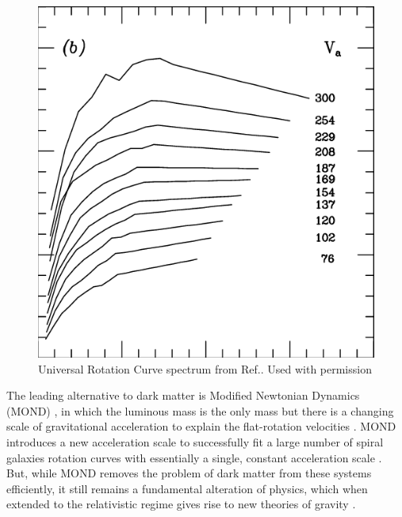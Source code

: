 \documentclass[reprint,%
 amsmath,amssymb,
 aps,
]{revtex4-1}
\begin{document}
 
   
 \begin{figure}[h!]
     \centering
     \includegraphics[width=\linewidth]{The-universal-rotation-curve-of-spiral-galaxies-at-different-luminosities-and-velocities}
     \caption{Universal Rotation Curve spectrum from Ref.\citep{salucci}. Used with permission}
     \label{fig:URC}
\end{figure}
  

    


 
The   leading   alternative     to dark matter  is   Modified Newtonian Dynamics (MOND) \cite{Milgrom},  in which     the   luminous mass is the only mass   but  there is   a changing   scale of gravitational acceleration to explain the flat-rotation velocities  \cite{McGaugh_2014}. MOND introduces a new acceleration scale to successfully fit   a large number of spiral galaxies  rotation curves with essentially a single, constant acceleration scale \cite{2016Lelli}.   But, while MOND removes the problem of dark matter from these systems efficiently, it still remains a   fundamental  alteration of   physics, which when extended  to the relativistic regime   gives rise to  new theories of gravity  \cite{PhysRevD.70.083509,doi:10.1142/S0217751X0703666X,Famaey2012}.
\end{document}
